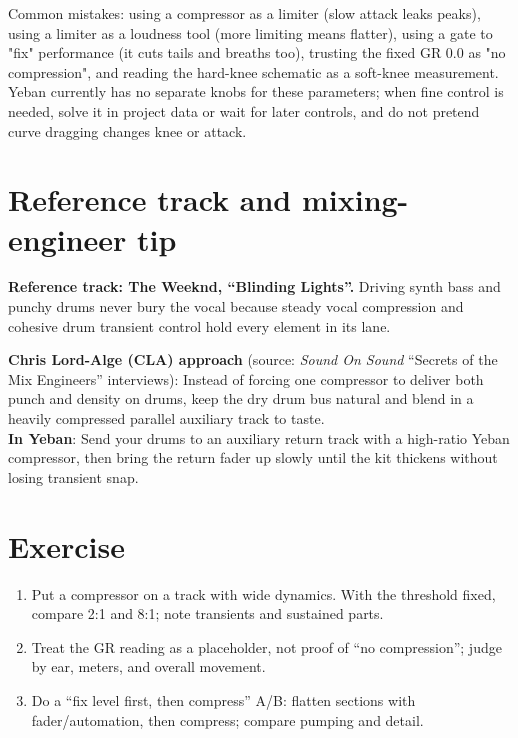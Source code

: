Common mistakes: using a compressor as a limiter (slow attack leaks peaks), using a limiter as a loudness tool (more limiting means flatter), using a gate to "fix" performance (it cuts tails and breaths too), trusting the fixed GR 0.0 as "no compression", and reading the hard-knee schematic as a soft-knee measurement. Yeban currently has no separate knobs for these parameters; when fine control is needed, solve it in project data or wait for later controls, and do not pretend curve dragging changes knee or attack.

\section{Reference track and mixing-engineer tip}

\textbf{Reference track: The Weeknd, ``Blinding Lights''.} Driving synth bass and punchy drums never bury the vocal because steady vocal compression and cohesive drum transient control hold every element in its lane.

\begin{tipbox}
\textbf{Chris Lord-Alge (CLA) approach} (source: \emph{Sound On Sound} ``Secrets of the Mix Engineers'' interviews): Instead of forcing one compressor to deliver both punch and density on drums, keep the dry drum bus natural and blend in a heavily compressed parallel auxiliary track to taste.\\
\textbf{In Yeban}: Send your drums to an auxiliary return track with a high-ratio Yeban compressor, then bring the return fader up slowly until the kit thickens without losing transient snap.
\end{tipbox}

\section{Exercise}


\begin{exercise}
\begin{enumerate}
  \item Put a compressor on a track with wide dynamics. With the threshold fixed, compare 2:1 and 8:1; note transients and sustained parts.
  \item Treat the GR reading as a placeholder, not proof of ``no compression''; judge by ear, meters, and overall movement.
  \item Do a ``fix level first, then compress'' A/B: flatten sections with fader/automation, then compress; compare pumping and detail.
\end{enumerate}
\end{exercise}

